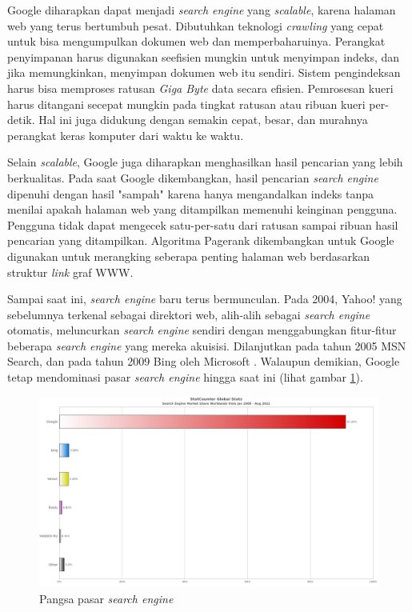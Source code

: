 Google diharapkan dapat menjadi \textit{search engine} yang \textit{scalable}, karena halaman web yang terus bertumbuh pesat. Dibutuhkan teknologi \textit{crawling} yang cepat untuk bisa mengumpulkan dokumen web dan memperbaharuinya. Perangkat penyimpanan harus digunakan seefisien mungkin untuk menyimpan indeks, dan jika memungkinkan, menyimpan dokumen web itu sendiri. Sistem pengindeksan harus bisa memproses ratusan \textit{Giga Byte} data secara efisien. Pemrosesan kueri harus ditangani secepat mungkin pada tingkat ratusan atau ribuan kueri per-detik. Hal ini juga didukung dengan semakin cepat, besar, dan murahnya perangkat keras komputer dari waktu ke waktu.

Selain \textit{scalable}, Google juga diharapkan menghasilkan hasil pencarian yang lebih berkualitas. Pada saat Google dikembangkan, hasil pencarian \textit{search engine} dipenuhi dengan hasil "sampah" karena hanya mengandalkan indeks tanpa menilai apakah halaman web yang ditampilkan memenuhi keinginan pengguna. Pengguna tidak dapat mengecek satu-per-satu dari ratusan sampai ribuan hasil pencarian yang ditampilkan. Algoritma Pagerank dikembangkan untuk Google digunakan untuk merangking seberapa penting halaman web berdasarkan struktur \textit{link} graf WWW.

Sampai saat ini, \textit{search engine} baru terus bermunculan. Pada 2004, Yahoo! yang sebelumnya terkenal sebagai direktori web, alih-alih sebagai \textit{search engine} otomatis, meluncurkan \textit{search engine} sendiri dengan menggabungkan fitur-fitur beberapa \textit{search engine} yang mereka akuisisi. Dilanjutkan pada tahun 2005 MSN Search, dan pada tahun 2009 Bing oleh Microsoft \citep{seymour2011}. Walaupun demikian, Google tetap mendominasi pasar \textit{search engine} hingga saat ini (lihat gambar \ref{gambar:search_engine_market_share}).

\begin{figure}[H]
	\centering
	\includegraphics[keepaspectratio, width=14cm]{gambar/search_engine_market_share}
	\caption{Pangsa pasar \textit{search engine} \citep{gsc2022marketshare}}
	\label{gambar:search_engine_market_share}
\end{figure}

